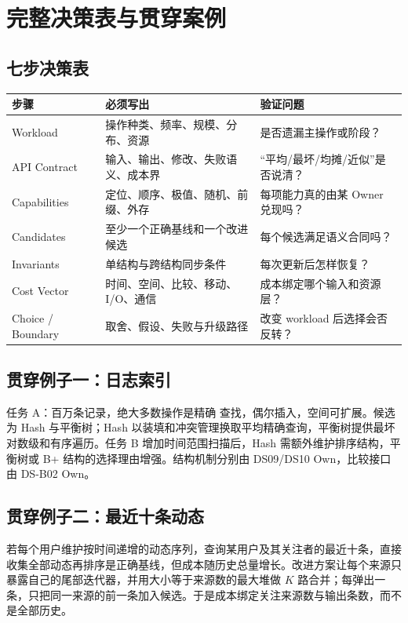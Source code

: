 \documentclass[UTF8,fontset=none,11pt,a4paper]{ctexart}
\begin{document}
\section{完整决策表与贯穿案例}

\subsection{七步决策表}
\begin{center}\small
\begin{tabularx}{\linewidth}{L{2.5cm}YY}
\toprule
步骤 & 必须写出 & 验证问题\\
\midrule
Workload & 操作种类、频率、规模、分布、资源 & 是否遗漏主操作或阶段？\\
API Contract & 输入、输出、修改、失败语义、成本界 & “平均/最坏/均摊/近似”是否说清？\\
Capabilities & 定位、顺序、极值、随机、前缀、外存 & 每项能力真的由某 Owner 兑现吗？\\
Candidates & 至少一个正确基线和一个改进候选 & 每个候选满足语义合同吗？\\
Invariants & 单结构与跨结构同步条件 & 每次更新后怎样恢复？\\
Cost Vector & 时间、空间、比较、移动、I/O、通信 & 成本绑定哪个输入和资源层？\\
Choice / Boundary & 取舍、假设、失败与升级路径 & 改变 workload 后选择会否反转？\\
\bottomrule
\end{tabularx}
\end{center}

\subsection{贯穿例子一：日志索引}
任务 A：百万条记录，绝大多数操作是精确  查找，偶尔插入，空间可扩展。候选为 Hash 与平衡树；Hash 以装填和冲突管理换取平均精确查询，平衡树提供最坏对数级和有序遍历。任务 B 增加时间范围扫描后，Hash 需额外维护排序结构，平衡树或 B+ 结构的选择理由增强。结构机制分别由 DS09/DS10 Own，比较接口由 DS-B02 Own。

\subsection{贯穿例子二：最近十条动态}
若每个用户维护按时间递增的动态序列，查询某用户及其关注者的最近十条，直接收集全部动态再排序是正确基线，但成本随历史总量增长。改进方案让每个来源只暴露自己的尾部迭代器，并用大小等于来源数的最大堆做 $K$ 路合并；每弹出一条，只把同一来源的前一条加入候选。于是成本绑定关注来源数与输出条数，而不是全部历史。
\end{document}
